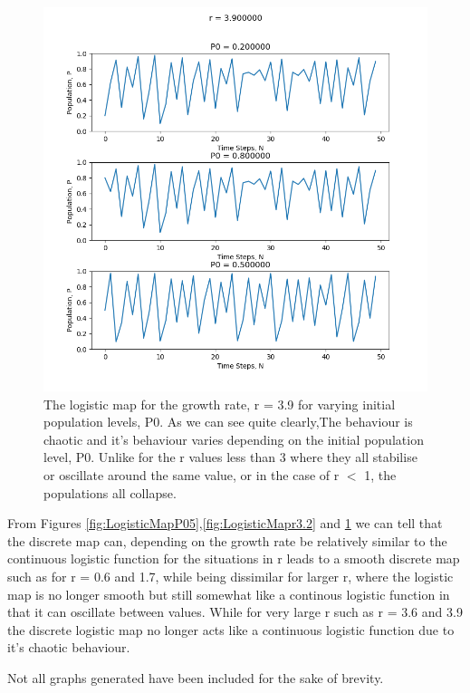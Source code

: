 \documentclass[11pt,a4paper]{CLabBookTemplate} %
\begin{document}
\begin{figure}[h!]
	\centering
	\includegraphics[width = 120mm]{Figures/DLMr6.png}
	\caption{The logistic map for the growth rate, r = 3.9 for varying initial population levels, P0. As we can see quite clearly,The behaviour is chaotic and it's behaviour varies depending on the initial population level, P0. Unlike for the r values less than 3 where they all stabilise or oscillate around the same value, or in the case of r $<$ 1, the populations all collapse.}
	\label{fig:LogisticMapr3.9}
\end{figure}

From Figures \ref{fig:LogisticMapP05},\ref{fig:LogisticMapr3.2} and \ref{fig:LogisticMapr3.9} we can tell that the discrete map can, depending on the growth rate be relatively similar to the continuous logistic function for the situations in r leads to a smooth discrete map such as for r = 0.6 and 1.7, while being dissimilar for larger r, where the logistic map is no longer smooth but still somewhat like a continous logistic function in that it can oscillate between values. While for very large r such as r = 3.6 and 3.9 the discrete logistic map no longer acts like a continuous logistic function due to it's chaotic behaviour. \par 
Not all graphs generated have been included for the sake of brevity. 

\clearpage
\newpage
\end{document}
